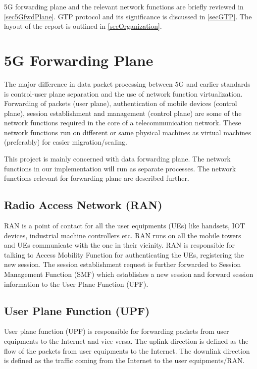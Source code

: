 5G forwarding plane and the relevant network functions are 
briefly reviewed in \ref{sec5GfwdPlane}. GTP protocol and its 
significance is discussed in \ref{secGTP}. 
The layout of the report is outlined in \ref{secOrganization}. 

\section {5G Forwarding Plane \label{sec:5GfwdPlane}}
The major difference in  data packet processing between 5G and earlier standards is control-user plane 
separation and the use of network function virtualization. Forwarding of packets (user plane), 
authentication of mobile devices (control plane), session establishment and management (control plane) are some of the network 
functions required in the core of a telecommunication network. These network functions run on different or same physical machines as 
virtual machines (preferably) for easier migration/scaling.

This project is mainly concerned with data forwarding plane. The network functions in our implementation will 
run as separate processes. The network functions relevant for forwarding plane are described further.
\subsection{Radio Access Network (RAN) \label{sec:RAN}} 
RAN is a point of contact for all the user equipments (UEs) like handsets, IOT devices, industrial machine controllers etc. 
RAN runs on all the mobile towers and UEs communicate with the one in their vicinity. RAN is
 responsible for talking to Access Mobility Function for authenticating the UEs, registering the  new
  session. The session establishment request is further forwarded to Session Management Function
  (SMF) which establishes a new session and forward session information to the User Plane Function (UPF). 
  \subsection{User Plane Function (UPF) \label{sec:UPF}}
  User plane function (UPF) is responsible for forwarding packets from user equipments to the
   Internet and vice versa. The uplink direction is defined as the flow of the packets from user
    equipments to the Internet. The downlink direction is defined as the traffic coming from the Internet  to the user equipments/RAN. 
  
